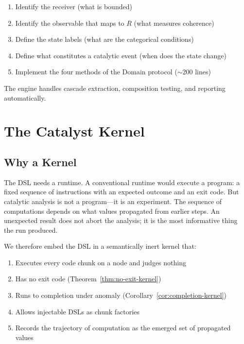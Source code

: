 \documentclass[11pt,a4paper]{article}
\theoremstyle{definition}
\theoremstyle{remark}
\newcommand{\Rorder}{R}
\begin{document}
\begin{enumerate}[nosep]
\item Identify the receiver (what is bounded)
\item Identify the observable that maps to $\Rorder$ (what measures coherence)
\item Define the state labels (what are the categorical conditions)
\item Define what constitutes a catalytic event (when does the state change)
\item Implement the four methods of the Domain protocol ($\sim$200 lines)
\end{enumerate}

The engine handles cascade extraction, composition testing, and reporting automatically.

\section{The Catalyst Kernel}
\label{sec:kernel}

\subsection{Why a Kernel}

The DSL needs a runtime. A conventional runtime would execute a program: a fixed sequence of instructions with an expected outcome and an exit code. But catalytic analysis is not a program---it is an experiment. The sequence of computations depends on what values propagated from earlier steps. An unexpected result does not abort the analysis; it is the most informative thing the run produced.

We therefore embed the DSL in a semantically inert kernel that:
\begin{enumerate}[nosep]
\item Executes every code chunk on a node and judges nothing
\item Has no exit code (Theorem~\ref{thm:no-exit-kernel})
\item Runs to completion under anomaly (Corollary~\ref{cor:completion-kernel})
\item Allows injectable DSLs as chunk factories
\item Records the trajectory of computation as the emerged set of propagated values
\end{enumerate}
\end{document}
